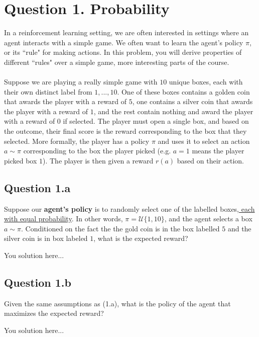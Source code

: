 \documentclass[12pt]{article}
\begin{document}
\section*{Question 1. Probability}
In a reinforcement learning setting, we are often interested in settings where an agent interacts with a simple game. We often want to learn the agent's policy $\pi$, or its ``rule" for making actions. In this problem, you will derive properties of different ``rules" over a simple game, more interesting parts of the course.
\\\\
Suppose we are playing a really simple game with $10$ unique boxes, each with their own distinct label from $1,...,10$. One of these boxes contains a golden coin that awards the player with a reward of $5$, one contains a silver coin that awards the player with a reward of $1$, and the rest contain nothing and award the player with a reward of $0$ if selected. The player must open a single box, and based on the outcome, their final score is the reward corresponding to the box that they selected. More formally, the player has a policy $\pi$ and uses it to select an action $a \sim \pi$ corresponding to the box the player picked (e.g. $a=1$ means the player picked box $1$). The player is then given a reward $r(a)$ based on their action.

\subsection*{Question 1.a}
Suppose our \textbf{agent's policy} is to randomly select one of the labelled boxes,\href{https://en.wikipedia.org/wiki/Discrete_uniform_distribution}{ each with equal probability}. In other words, $\pi = \mathcal{U}\{1,10\}$, and the agent selects a box $a \sim \pi$. Conditioned on the fact the the gold coin is in the box labelled $5$ and the silver coin is in box labeled $1$, what is the expected reward?
\begin{solution}
You solution here...
\end{solution}

\subsection*{Question 1.b}
Given the same assumptions as (1.a), what is the policy of the agent that maximizes the expected reward?
\begin{solution}
You solution here...
\end{solution}
\end{document}
